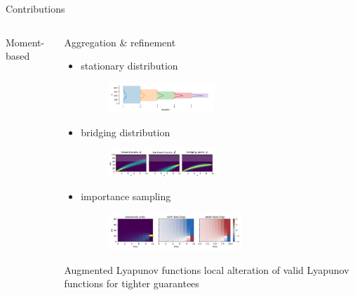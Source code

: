 \documentclass[9pt]{beamer}
\begin{document}
\begin{frame}{Contributions}
\begin{columns}
\begin{column}{.45\paperwidth}
\begin{block}{Moment-based}
            \end{block}
        \end{column}
        \begin{column}{.45\paperwidth}
            \begin{block}{Aggregation \& refinement}
                \begin{itemize}
                    \item stationary distribution \parencite{backenkohler2021abstraction}
                        \begin{figure}
                            \includegraphics[width=4cm]{../gfx/bd_truncs.pdf}
                        \end{figure}
                    \item bridging distribution \parencite{backenkohler2020analysis}
                        \begin{figure}
                            \includegraphics[width=4cm]{../gfx/bridging_bd.pdf}
                        \end{figure}
                    \item importance sampling
                        \begin{figure}
                            \includegraphics[width=5cm]{../gfx/biases.pdf}
                        \end{figure}
                \end{itemize}
            \end{block}
            \begin{block}{Augmented Lyapunov functions}
                local alteration of valid Lyapunov functions for tighter guarantees
            \end{block}
        \end{column}
    \end{columns}
\end{frame}
\end{document}
